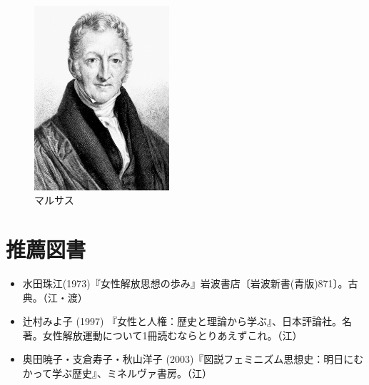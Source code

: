  \begin{figure}[htbp]
   \centering
     \includegraphics[width=50mm]{images/marthus.jpg}
   \caption{マルサス}
 \end{figure}



\section{推薦図書}





\begin{itemize}
\item 水田珠江(1973)『女性解放思想の歩み』岩波書店〔岩波新書(青版)871〕。古典。（江・渡）
\item 辻村みよ子 (1997) 『女性と人権：歴史と理論から学ぶ』、日本評論社。名著。女性解放運動について1冊読むならとりあえずこれ。（江）
\item 奥田暁子・支倉寿子・秋山洋子 (2003)『図説フェミニズム思想史：明日にむかって学ぶ歴史』、ミネルヴァ書房。（江）
\end{itemize}





